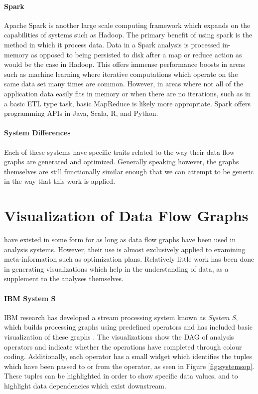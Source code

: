 \paragraph{Spark}
Apache Spark \cite{Spark2015} is another large scale computing framework which expands on the capabilities of systems such as Hadoop. The primary benefit of using spark is the method in which it process data. Data in a Spark analysis is processed in-memory as opposed to being persisted to disk after a map or reduce action as would be the case in Hadoop. This offers immense performance boosts in areas such as machine learning where iterative computations which operate on the same data set many times are common. However, in areas where not all of the application data easily fits in memory or when there are no iterations, such as in a basic ETL type task, basic MapReduce is likely more appropriate.  Spark offers programming APIs in Java, Scala, R, and Python.

\paragraph{System Differences}
Each of these systems have specific traits related to the way their data flow graphs are generated and optimized. Generally speaking however, the graphs themselves are still functionally similar enough that we can attempt to be generic in the way that this work is applied. 

\section{Visualization of Data Flow Graphs}
\label{sec:dfgviz}

 have existed in some form for as long as data flow graphs have been used in analysis systems. However, their use is almost exclusively applied to examining meta-information such as optimization plans. Relatively little work has been done in generating visualizations which help in the understanding of data, as a supplement to the analyses themselves.

\paragraph{IBM System S}
IBM research has developed a stream processing system known as \emph{System S}, which builds processing graphs using predefined operators \cite{Gedik2008} and has included basic visualization of these graphs \cite{Pauw2010}. The visualizations show the DAG of analysis operators and indicate whether the operations have completed through colour coding. Additionally, each operator has a small widget which identifies the tuples which have been passed to or from the operator, as seen in Figure \ref{fig:systemsop}. These tuples can be highlighted in order to show specific data values, and to highlight data dependencies which exist downstream.

